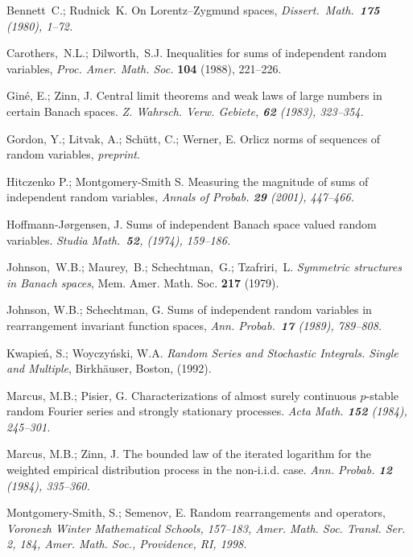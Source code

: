 \documentclass[12pt]{amsart}
\begin{document}
\begin{thebibliography}{999}

Bennett~C.; Rudnick~K.
On Lorentz--Zygmund spaces, {\em
Dissert.\
Math.\ {\bf 175} (1980), 1--72.}

Carothers,~N.L.; Dilworth,~S.J. Inequalities for sums
of
independent random variables, {\em Proc. Amer. Math. Soc.} {\bf 104} (1988),
221--226.

Gin\'e, E.; Zinn, J. 
Central limit theorems and weak laws of large numbers in certain Banach spaces. 
{\em Z. Wahrsch. Verw. Gebiete, {\bf 62} (1983), 323--354.}

Gordon, Y.; Litvak, A.; Sch\"utt, C.; Werner, E.
Orlicz norms of sequences of random variables,
{\em preprint}.

Hitczenko P.; Montgomery-Smith S. 
Measuring the magnitude of sums of independent random variables,
{\em Annals of Probab. {\bf 29} (2001), 447--466.}

Hoffmann-J{\o}rgensen, J. 
Sums of independent Banach space valued random variables. 
{\em Studia Math.\ {\bf 52}, (1974), 159--186.}

Johnson,~W.B.; Maurey,~B.; Schechtman,~G.; Tzafriri,~L.
{\em Symmetric structures in Banach spaces}, Mem. 
Amer. Math. Soc. {\bf 217} (1979).

Johnson, W.B.; Schechtman, G. Sums of independent
random variables in rearrangement invariant function spaces, {\em
Ann. Probab.\ {\bf 17} (1989), 789--808.}

 Kwapie\'n, S.; Woyczy\'nski, W.A.  {\em
Random Series and Stochastic Integrals. Single and
Multiple}, Birkh\"auser, Boston, (1992).

Marcus, M.B.; Pisier, G. 
Characterizations of almost surely continuous $p$-stable random Fourier 
series and strongly stationary processes.
{\em Acta Math. {\bf 152} (1984), 245--301.}

Marcus, M.B.; Zinn, J. 
The bounded law of the iterated logarithm for the weighted empirical 
distribution process in the non-i.i.d.
case. 
{\em Ann. Probab. {\bf 12} (1984), 335--360.}

Montgomery-Smith, S.; Semenov, E. 
Random rearrangements and operators, 
{\em Voronezh Winter Mathematical Schools,
157--183, Amer. Math. Soc. Transl. Ser. 2, 184, 
Amer. Math. Soc., Providence, RI, 1998.}


\end{thebibliography}
\end{document}
